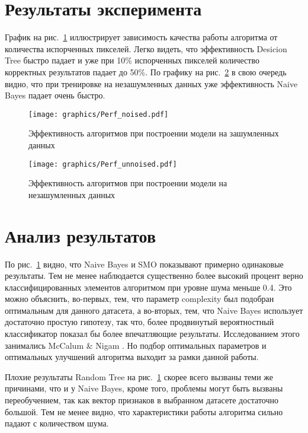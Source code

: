 \documentclass{article}
\begin{document}
\section{Результаты эксперимента}
График на рис.~\ref{fig:perf1} иллюстрирует зависимость качества работы алгоритма от количества испорченных пикселей. Легко видеть, что эффективность Desicion Tree быстро падает и уже при 10\% испорченных пикселей количество корректных результатов падает до 50\%.
По графику на рис.~\ref{fig:perf2} в свою очередь видно, что при тренировке на незашумленных данных уже эффективность Naive Bayes падает очень быстро.
\newpage
\begin{figure}[ht!]
\texttt{[image: graphics/Perf\_noised.pdf]}
\captionsetup{justification=centering}
\caption{Эффективность алгоритмов при построении модели на зашумленных данных}
\label{fig:perf1}
\end{figure}


\begin{figure}[ht!]
\texttt{[image: graphics/Perf\_unnoised.pdf]}
\captionsetup{justification=centering}
\caption{Эффективность алгоритмов при построении модели на незашумленных данных}
\label{fig:perf2}
\end{figure}
\clearpage


\section{Анализ результатов}
\par
По рис.~\ref{fig:perf1} видно, что Naive Bayes и SMO показывают примерно одинаковые результаты. Тем не менее наблюдается существенно более высокий процент верно классифицированных элементов алгоритмом при уровне шума меньше 0.4. Это можно объяснить, во-первых, тем, что параметр complexity был подобран оптимальным для данного датасета, а во-вторых, тем, что Naive Bayes использует достаточно простую гипотезу, так что, более продвинутый вероятностный классификатор показал бы более впечатляющие результаты. Исследованием этого занимались McCalum \& Nigam \cite{Mccallum1998}. Но подбор оптимальных параметров и оптимальных улучшений алгоритма выходит за рамки данной работы.

Плохие результаты Random Tree на рис.~\ref{fig:perf1} скорее всего вызваны теми же причинами, что и у Naive Bayes, кроме того, проблемы могут быть вызваны переобучением, так как вектор признаков в выбранном датасете достаточно большой. Тем не менее видно, что характеристики работы алгоритма сильно падают с количеством шума.
\end{document}
